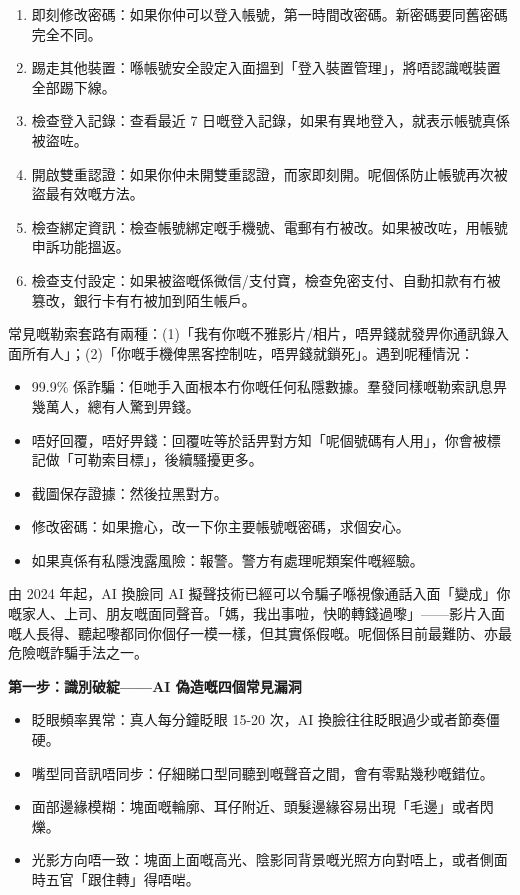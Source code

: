 
\begin{enumerate}
  \item 即刻修改密碼：如果你仲可以登入帳號，第一時間改密碼。新密碼要同舊密碼完全不同。
  \item 踢走其他裝置：喺帳號安全設定入面搵到「登入裝置管理」，將唔認識嘅裝置全部踢下線。
  \item 檢查登入記錄：查看最近 7 日嘅登入記錄，如果有異地登入，就表示帳號真係被盜咗。
  \item 開啟雙重認證：如果你仲未開雙重認證，而家即刻開。呢個係防止帳號再次被盜最有效嘅方法。
  \item 檢查綁定資訊：檢查帳號綁定嘅手機號、電郵有冇被改。如果被改咗，用帳號申訴功能搵返。
  \item 檢查支付設定：如果被盜嘅係微信/支付寶，檢查免密支付、自動扣款有冇被篡改，銀行卡有冇被加到陌生帳戶。
\end{enumerate}


常見嘅勒索套路有兩種：(1)「我有你嘅不雅影片/相片，唔畀錢就發畀你通訊錄入面所有人」；(2)「你嘅手機俾黑客控制咗，唔畀錢就鎖死」。遇到呢種情況：

\begin{itemize}
  \item 99.9\% 係詐騙：佢哋手入面根本冇你嘅任何私隱數據。羣發同樣嘅勒索訊息畀幾萬人，總有人驚到畀錢。
  \item 唔好回覆，唔好畀錢：回覆咗等於話畀對方知「呢個號碼有人用」，你會被標記做「可勒索目標」，後續騷擾更多。
  \item 截圖保存證據：然後拉黑對方。
  \item 修改密碼：如果擔心，改一下你主要帳號嘅密碼，求個安心。
  \item 如果真係有私隱洩露風險：報警。警方有處理呢類案件嘅經驗。
\end{itemize}


由 2024 年起，AI 換臉同 AI 擬聲技術已經可以令騙子喺視像通話入面「變成」你嘅家人、上司、朋友嘅面同聲音。「媽，我出事啦，快啲轉錢過嚟」——影片入面嘅人長得、聽起嚟都同你個仔一模一樣，但其實係假嘅。呢個係目前最難防、亦最危險嘅詐騙手法之一。

\textbf{第一步：識別破綻——AI 偽造嘅四個常見漏洞}\par

\begin{itemize}
  \item 眨眼頻率異常：真人每分鐘眨眼 15-20 次，AI 換臉往往眨眼過少或者節奏僵硬。
  \item 嘴型同音訊唔同步：仔細睇口型同聽到嘅聲音之間，會有零點幾秒嘅錯位。
  \item 面部邊緣模糊：塊面嘅輪廓、耳仔附近、頭髮邊緣容易出現「毛邊」或者閃爍。
  \item 光影方向唔一致：塊面上面嘅高光、陰影同背景嘅光照方向對唔上，或者側面時五官「跟住轉」得唔啱。
\end{itemize}

